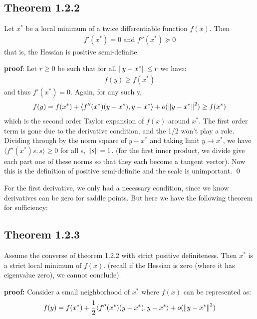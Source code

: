 \documentclass[12pt,a4paper]{article}
\begin{document}
	
	\subsection*{Theorem 1.2.2}\label{thm122}
	Let $x^*$ be a local minimum of a twice differentiable function $f(x)$. Then
	\begin{align*}
		f'(x^*) = 0 \text{ and } f''(x^*) \succeq 0
	\end{align*}
	that is, the Hessian is positive semi-definite. 
	
	\textbf{proof}: Let $r \geq 0$ be such that for all $\norm{y - x^*} \leq r$ we have:
	\begin{align*}
		f(y) \geq f(x^*)
	\end{align*}
	 and thus $f'(x^*) = 0$. Again, for any such y,
	 \begin{align*}
	 	f(y) = f(x^*) + \langle f''(x^*)(y-x^*), y-x^* \rangle + o(\norm{y-x^*}^2) \geq f(x^*)
	 \end{align*}
	which is the second order Taylor expansion of $f(x)$ around $x^*$. The first order term is gone due to the derivative condition, and the 1/2 won't play a role. Dividing through by the norm square of $y-x^*$ and taking limit $y \rightarrow x^*$, we have $\langle f''(x^*)s,s \rangle \geq 0$ for all s, $\norm{s} = 1$. (for the first inner product, we divide give each part one of these norms so that they each become a tangent vector). Now this is the definition of positive semi-definite and the scale is unimportant. \qed 
	
	For the first derivative, we only had a necessary condition, since we know derivatives can be zero for saddle points. But here we have the following theorem for sufficiency:
	
	\subsection*{Theorem 1.2.3}\label{thm123}
	Assume the converse of theorem 1.2.2 with strict positive definiteness. Then $x^*$ is a strict local minimum of $f(x)$. (recall if the Hessian is zero (where it has eigenvalue zero), we cannot conclude).
	
	\textbf{proof:} Consider a small neighborhood of $x^*$ where $f(x)$ can be represented as:
	\begin{align*}
		f(y) = f(x^*) + \frac{1}{2} \langle f''(x^*)(y-x^*), y-x^* \rangle + o(\norm{y-x^*}^2)
	\end{align*}
	
\end{document}
